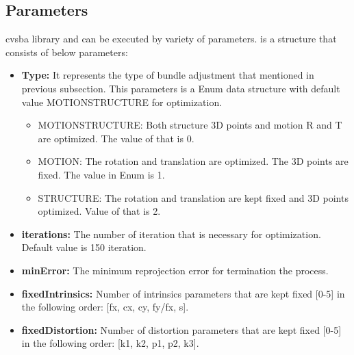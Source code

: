 \subsection{Parameters}
cvsba library and  can be executed by variety of parameters.  is a structure that consists of below parameters:
\begin{itemize}
\item \textbf{Type:} It represents the type of bundle adjustment that mentioned in previous subsection. This parameters is a Enum data structure with default value MOTIONSTRUCTURE for optimization.
		\begin{itemize}
			\item MOTIONSTRUCTURE: Both structure {3D points} and motion {R and T} are optimized. The value of that is 0.
			\item MOTION: The rotation and translation are optimized. The 3D points are fixed. The value in Enum is 1.
			\item STRUCTURE: The rotation and translation are kept fixed and 3D points optimized. Value of that is 2. 
		\end {itemize}
\item \textbf{iterations:} The number of iteration that is necessary for optimization. Default value is 150 iteration.
\item \textbf{minError:} The minimum reprojection error for termination the process.
\item \textbf{fixedIntrinsics:} Number of intrinsics parameters that are kept fixed [0-5] in the following order: [fx, cx, cy, fy/fx, s].
\item \textbf{fixedDistortion:} Number of distortion parameters that are kept fixed [0-5] in the following order: [k1, k2, p1, p2, k3].
\end{itemize}

